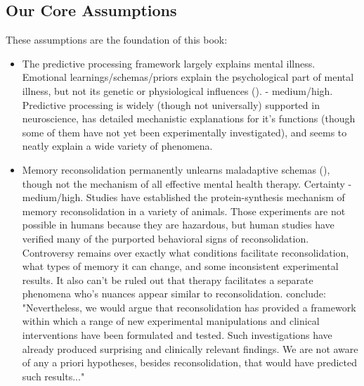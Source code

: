 \documentclass[12pt,letterpaper]{book}
\begin{document}
\subsection*{Our Core Assumptions}
These assumptions are the foundation of this book:
\begin{itemize}
	\item The predictive processing framework largely explains mental illness. Emotional learnings/schemas/priors explain the psychological part of mental illness, but not its genetic or physiological influences (\textcite{aizenbud2025neuralmechanismspredictiveprocessing,clark2015surfing,Clark_Watson_Friston_2018,eckerUnlocking,laneReconsolidation}). - medium/high. Predictive processing is widely (though not universally) supported in neuroscience, has detailed mechanistic explanations for it's functions (though some of them have not yet been experimentally investigated), and seems to neatly explain a wide variety of phenomena.
	\item Memory reconsolidation permanently unlearns maladaptive schemas (\textcite{eckerUnlocking,laneReconsolidation,elsey2018human}), though not the mechanism of all effective mental health therapy. Certainty - medium/high. Studies have established the protein-synthesis mechanism of memory reconsolidation in a variety of animals. Those experiments are not possible in humans because they are hazardous, but human studies have verified many of the purported behavioral signs of reconsolidation. Controversy remains over exactly what conditions facilitate reconsolidation, what types of memory it can change, and some inconsistent experimental results. It also can't be ruled out that therapy facilitates a separate phenomena who's nuances appear similar to reconsolidation. \textcite{elsey2018human} conclude: "Nevertheless, we would argue that reconsolidation has provided a framework within which a range of new experimental manipulations and clinical interventions have been formulated and tested. Such investigations have already produced surprising and clinically relevant findings. We are not aware of any a priori hypotheses, besides reconsolidation, that would have predicted such results..."

\end{itemize}
\end{document}
